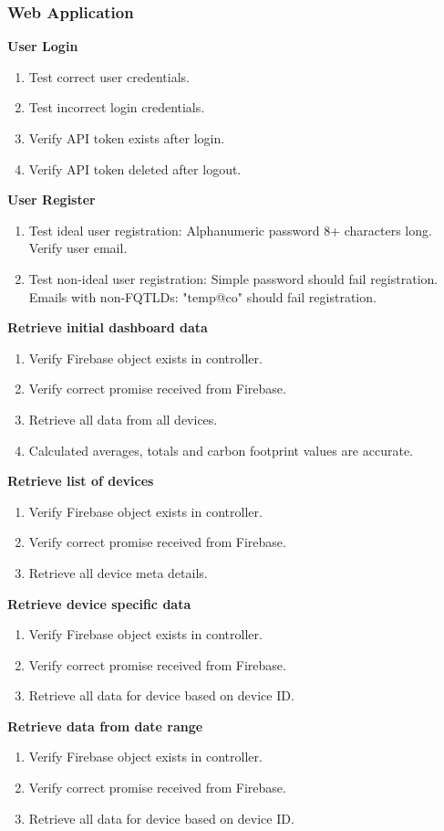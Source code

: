 \documentclass[a4paper,10pt]{article}
\begin{document}
		\subsubsection{Web Application}
		\textbf{User Login}
			\begin{enumerate}
				\item Test correct user credentials.
				\item Test incorrect login credentials.
				\item Verify API token exists after login.
				\item Verify API token deleted after logout.
			\end{enumerate}
		\textbf{User Register}
			\begin{enumerate}
				\item Test ideal user registration: Alphanumeric password 8+ characters long.
				Verify user email.
				\item Test non-ideal user registration: Simple password should fail registration.
				Emails with non-FQTLDs: "temp@co" should fail registration.
			\end{enumerate}
		\textbf{Retrieve initial dashboard data}
			\begin{enumerate}
				\item Verify Firebase object exists in controller.
				\item Verify correct promise received from Firebase.
				\item Retrieve all data from all devices.
				\item Calculated averages, totals and carbon footprint values are accurate.
			\end{enumerate}
		\textbf{Retrieve list of devices}
			\begin{enumerate}
				\item Verify Firebase object exists in controller.
				\item Verify correct promise received from Firebase.
				\item Retrieve all device meta details.
			\end{enumerate}
		\textbf{Retrieve device specific data}
			\begin{enumerate}
				\item Verify Firebase object exists in controller.
				\item Verify correct promise received from Firebase.
				\item Retrieve all data for device based on device ID.
			\end{enumerate}
		\textbf{Retrieve data from date range}
			\begin{enumerate}
				\item Verify Firebase object exists in controller.
				\item Verify correct promise received from Firebase.
				\item Retrieve all data for device based on device ID.
			\end{enumerate}
	
\end{document}
